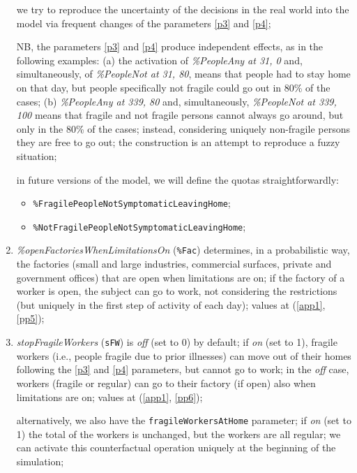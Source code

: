 \documentclass[graybox]{svmult}
\begin{document}
\begin{enumerate}[label=\roman*]
we try to reproduce the uncertainty of the decisions in the real world into the model via frequent changes of the parameters \ref{p3} and \ref{p4};

NB, the parameters \ref{p3} and \ref{p4} produce independent effects, as in the following examples: (a) the activation of \emph{\%PeopleAny at 31, 0} and, simultaneously, of \emph{\%PeopleNot at 31, 80}, means that people had to stay home on that day, but people specifically not fragile could go out in 80\% of the cases; (b) \emph{\%PeopleAny at 339, 80} and, simultaneously, \emph{\%PeopleNot at 339, 100} means that fragile and not fragile persons cannot always go around, but only in the 80\% of the cases; instead, considering uniquely non-fragile persons they are free to go out; the construction is an attempt to reproduce a fuzzy situation;

in future versions of the model, we will define the quotas straightforwardly:
\begin{itemize}
\item \verb|%FragilePeopleNotSymptomaticLeavingHome|;
\item \verb|%NotFragilePeopleNotSymptomaticLeavingHome|;
\end{itemize}

\item \label{p5} \emph{\%openFactoriesWhenLimitationsOn} (\verb|%Fac|) 
determines, in a probabilistic way, the factories (small and large industries, commercial surfaces, private and government offices) that
are open when limitations are on; if the factory of a worker is open, the subject can go to work, not considering the restrictions (but uniquely in the first step of activity of each day); values at (\ref{app1}, \ref{pp5}); 

\item \label{p6} \emph{stopFragileWorkers} (\verb|sFW|) is \emph{off} (set to 0) by default; if \emph{on} (set to 1), fragile workers (i.e., people fragile due to prior illnesses) can move out of their homes following the \ref{p3} and \ref{p4} parameters, but cannot go to work; in the \emph{off} case, workers (fragile or regular) can go to their factory (if open) also when limitations are on; values at (\ref{app1}, \ref{pp6});

alternatively, we also have the \verb|fragileWorkersAtHome| parameter; if \emph{on} (set to 1) the total of the workers is unchanged, but the workers are all regular; we can activate this counterfactual operation uniquely at the beginning of the simulation;


\end{enumerate}
\end{document}
